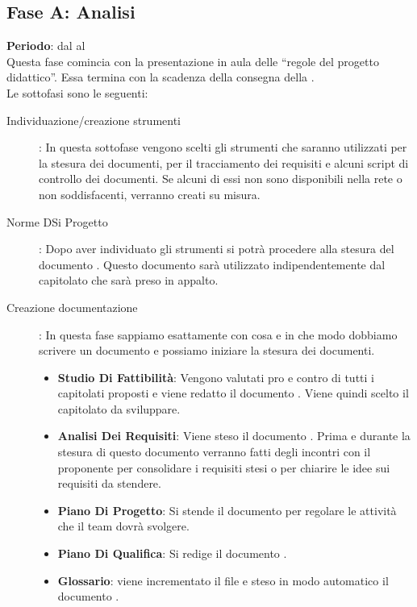 \subsection{Fase A: Analisi}
	\textbf{Periodo}: dal  al  \\
	Questa fase comincia con la presentazione in aula delle “regole del progetto didattico”. Essa termina con la scadenza della consegna della .\\Le sottofasi sono le seguenti:
	\begin{description}
		\item[Individuazione/creazione strumenti]: In questa sottofase vengono scelti gli strumenti che saranno utilizzati per la stesura dei documenti, per il tracciamento dei requisiti e alcuni script di controllo dei documenti. Se alcuni di essi non sono disponibili nella rete o non soddisfacenti, verranno creati su misura.
		\item[Norme DSi Progetto]: Dopo aver individuato gli strumenti si potrà procedere alla stesura del documento . Questo documento sarà utilizzato indipendentemente dal capitolato che sarà preso in appalto.
		\item[Creazione documentazione]: In questa fase sappiamo esattamente con cosa e in che modo dobbiamo scrivere un documento e possiamo iniziare la stesura dei documenti.
			\begin{itemize}
				\item \textbf{Studio Di Fattibilità}: Vengono valutati pro e contro di tutti i capitolati proposti e viene redatto il documento . Viene quindi scelto il capitolato da sviluppare.
				\item \textbf{Analisi Dei Requisiti}: Viene steso il documento . Prima e durante la stesura di questo documento verranno fatti degli incontri con il proponente per consolidare i requisiti stesi o per chiarire le idee sui requisiti da stendere.
				\item \textbf{Piano Di Progetto}: Si stende il documento  per regolare le attività che il team dovrà svolgere.
				\item \textbf{Piano Di Qualifica}: Si redige il documento .
				\item \textbf{Glossario}: viene incrementato il file   e steso in modo automatico il documento .
			\end{itemize}
	\end{description}
